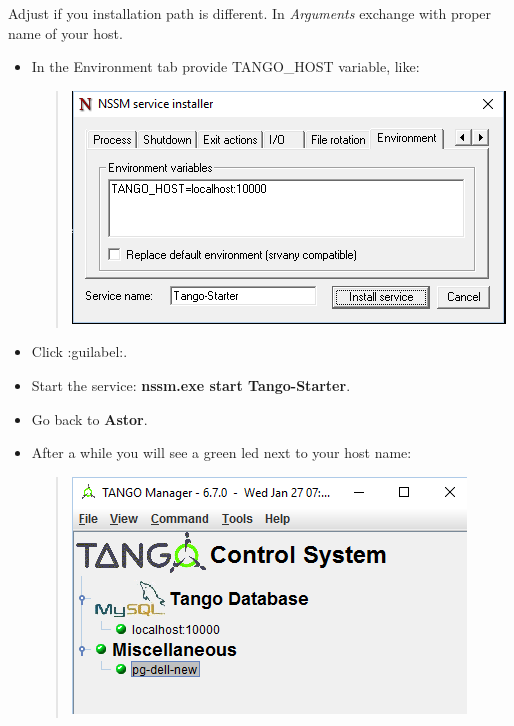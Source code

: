 \documentclass[letterpaper,10pt,english]{sphinxmanual}
\begin{document}
\begin{itemize}
\begin{description}
\begin{itemize}
\end{itemize}

Adjust if you installation path is different. In \emph{Arguments} exchange  with proper name
of your host.
\begin{itemize}
\item {} 
In the Environment tab provide TANGO\_HOST variable, like:
\begin{quote}

\includegraphics{starter-as-service-02.png}
\end{quote}

\item {} 
Click :guilabel:.

\item {} 
Start the service: \textbf{nssm.exe start Tango-Starter}.

\item {} 
Go back to \textbf{Astor}.

\item {} 
After a while you will see a green led next to your host name:
\begin{quote}

\includegraphics{starter-02.png}
\end{quote}

\end{itemize}


\end{description}
\end{itemize}
\end{document}
